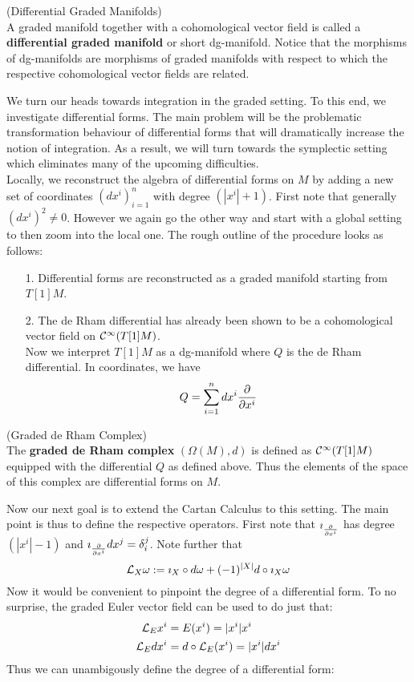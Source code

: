 
\begin{definition} (Differential Graded Manifolds)\\
  A graded manifold together with a cohomological vector field is called a \textbf{differential graded manifold} or short dg-manifold. Notice that the morphisms of dg-manifolds are morphisms of graded manifolds with respect to which the respective cohomological vector fields are related.
\end{definition}

We turn our heads towards integration in the graded setting. To this end, we investigate differential forms. The main problem will be the problematic transformation behaviour of differential forms that will dramatically increase the notion of integration. As a result, we will turn towards the symplectic setting which eliminates many of the upcoming difficulties.\\

Locally, we reconstruct the algebra of differential forms on $M$ by adding a new set of coordinates $(dx^i)^n_{i=1}$ with degree $(|x^i|+1)$. First note that generally $(dx^i)^2 \neq 0$. However we again go the other way and start with a global setting to then zoom into the local one. The rough outline of the procedure looks as follows:

\begin{itemize}
  \item[1.] Differential forms are reconstructed as a graded manifold starting from $T[1]M$.
  \item[2.] The de Rham differential has already been shown to be a cohomological vector field on $\mathcal{C}^{\infty}(T[1]M)$.\\
  Now we interpret $T[1]M$ as a dg-manifold where $Q$ is the de Rham differential. In coordinates, we have
  $$ Q = \sum_{i=1}^n dx^i \frac{\partial }{\partial x^i} $$
\end{itemize}

\begin{definition} (Graded de Rham Complex)\\
  The \textbf{graded de Rham complex} $(\Omega(M), d)$ is defined as $\mathcal{C}^{\infty}(T[1]M)$ equipped with the differential $Q$ as defined above. Thus the elements of the space of this complex are differential forms on $M$.
\end{definition}

Now our next goal is to extend the Cartan Calculus to this setting. The main point is thus to define the respective operators. First note that $ \imath_{\frac{\partial }{\partial x^i}} $ has degree $(|x^i|-1)$ and $ \imath_{\frac{\partial }{\partial x^i}} dx^j = \delta^j_i $. Note further that
$$ \mathcal{L}_{X}\omega := \imath_X \circ d\omega + (-1)^{|X|} d \circ \imath_X \omega $$
Now it would be convenient to pinpoint the degree of a differential form. To no surprise, the graded Euler vector field can be used to do just that:
\begin{align}
  \mathcal{L}_{E} x^i &= E(x^i) = |x^i| x^i\\
  \mathcal{L}_{E} dx^i &= d \circ \mathcal{L}_{E}(x^i) = |x^i| dx^i
\end{align}
Thus we can unambigously define the degree of a differential form:

